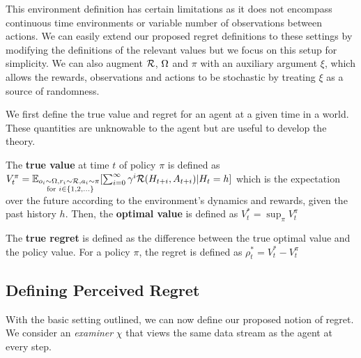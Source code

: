 This environment definition has certain limitations as it does not encompass continuous time environments or variable number of observations between actions. We can easily extend our proposed regret definitions to these settings by modifying the definitions of the relevant values but we focus on this setup for simplicity.
We can also augment $\mathcal{R}$, $\Omega$ and $\pi$ with an auxiliary argument $\xi$, which allows the rewards, observations and actions to be stochastic by treating $\xi$ as a source of randomness. 

We first define the true value and regret for an agent at a given time in a world. These quantities are unknowable to the agent but are useful to develop the theory. 


\begin{definition}
The \textbf{true value} at time $t$ of policy $\pi$ is defined as $V_t^\pi = \mathbb{E}_{\substack{o_i \sim \Omega, r_i \sim \mathcal{R}, a_i \sim \pi \\ \text{ for } i \in \{1, 2, ...\} }}[\sum_{i=0}^\infty \gamma^i \mathcal{R}(H_{t+i}, A_{t+i}) | H_t=h]$ which is the expectation over the future according to the environment's dynamics and rewards, given the past history $h$. 
Then, the \textbf{optimal value} is defined as $V^*_t =\sup_\pi V^\pi_t$
\end{definition}

\begin{definition}
    The \textbf{true regret} is defined as the difference between the true optimal value and the policy value. For a policy $\pi$, the regret is defined as $\rho^*_t = V^*_t - V^\pi_t$
\end{definition}




\subsection{Defining Perceived Regret}


With the basic setting outlined, we can now define our proposed notion of regret. 
We consider an \textit{examiner} $\chi$ that views the same data stream as the agent at every step. 

